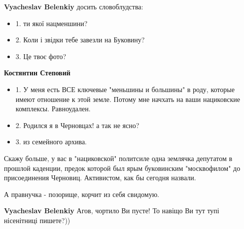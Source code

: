 \begin{itemize}
\begin{itemize}
 
\textbf{Vyacheslav Belenkiy} досить словоблудства:

\begin{itemize}
  \item 1. ти якої нацменшини?
  \item 2. Коли і звідки тебе завезли на Буковину?
  \item 3. Це твоє фото?
\end{itemize}

 
\textbf{Костянтин Степовий}

\begin{itemize}
\item 1. У меня есть ВСЕ ключевые "меньшины и большины" в роду, которые имеют
отношение к этой земле. Потому мне начхать на ваши нациковские комплексы.
Равноудален.

\item 2. Родился я в Черновцах! а так не ясно?

\item 3. из семейного архива.
\end{itemize}

Скажу больше, у вас в "нациковской" политсиле одна землячка депутатом в прошлой
каденции, предок которой был ярым буковинским "москвофилом" до присоединения
Черновиц. Активистом, как бы сегодня назвали.

А правнучка - позорище, корчит из себя свидомую.

 
\textbf{Vyacheslav Belenkiy}
Агов, чортило Ви пусте!
То навіщо Ви тут тупі нісенітниці пишете?))

 

\end{itemize}
\end{itemize}
